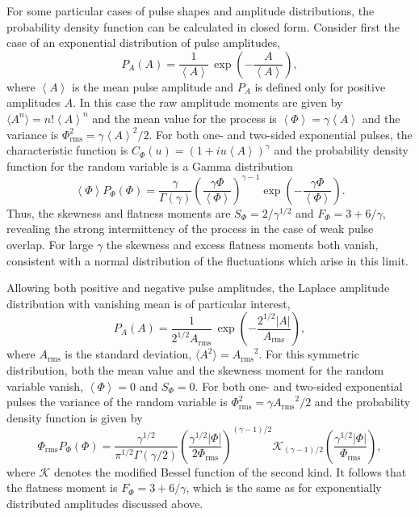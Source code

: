 \documentclass[aps,prb,12pt,a4paper,preprint,amsmath,amssymb,groupedaddress]{revtex4-1}
\newcommand{\ave}[1]{{\left<#1\right>}}
\newcommand{\abs}[1]{{\left|#1\right|}}\newcommand{\order}[1]{{\mathcal{O}\left(#1\right)}}
\newcommand{\Phiave}{\ensuremath{\ave{\Phi}}}
\newcommand{\Phirms}{\ensuremath{\Phi}_\text{rms}}
\newcommand{\Arms}{\ensuremath{A_\text{rms}}}
\newcommand{\Aave}{\ensuremath{\ave{A}}}
\begin{document}
For some particular cases of pulse shapes and amplitude distributions, the probability density function can be calculated in closed form. Consider first the case of an exponential distribution of pulse amplitudes,
\begin{equation}
P_A(A) = \frac{1}{\Aave}\,\exp\left( - \frac{A}{\Aave} \right) ,
\end{equation}
where $\Aave$ is the mean pulse amplitude and $P_A$ is defined only for positive amplitudes $A$. In this case the raw amplitude moments are given by $\langle{A^n}\rangle=n!\Aave^n$ and the mean value for the process is $\Phiave=\gamma\Aave$ and the variance is $\Phirms^2=\gamma\Aave^2/2$. For both one- and two-sided exponential pulses, the characteristic function is $C_\Phi(u)=(1+iu\Aave)^\gamma$ and the probability density function for the random variable is a Gamma distribution\cite{garcia-prl,garcia-php,theodorsen-php}
\begin{equation}
\Phiave P_\Phi(\Phi) = \frac{\gamma}{\Gamma(\gamma)}\left( \frac{\gamma\Phi}{\Phiave} \right)^{\gamma-1}\exp\left( - \frac{\gamma\Phi}{\Phiave} \right) .
\end{equation}
Thus, the skewness and flatness moments are $S_\Phi=2/\gamma^{1/2}$ and $F_\Phi=3+6/\gamma$, revealing the strong intermittency of the process in the case of weak pulse overlap. For large $\gamma$ the skewness and excess flatness moments both vanish, consistent with a normal distribution of the fluctuations which arise in this limit.\cite{garcia-prl,garcia-php}


Allowing both positive and negative pulse amplitudes, the Laplace amplitude distribution with vanishing mean is of particular interest,
\begin{equation}
P_A(A) = \frac{1}{2^{1/2}\Arms}\,\exp\left( - \frac{2^{1/2}\abs{A}}{\Arms} \right) ,
\end{equation}
where $\Arms$ is the standard deviation, $\langle{A^2}\rangle=\Arms^2$. 
For this symmetric distribution, both the mean value and the skewness moment for the random variable vanish, $\Phiave=0$ and $S_\Phi=0$. For both one- and two-sided exponential pulses the variance of the random variable is $\Phirms^2=\gamma\Arms^2/2$ and the probability density function is given by\cite{theodorsen-ppcf}
\begin{equation}
\Phirms P_\Phi(\Phi) = \frac{\gamma^{1/2}}{\pi^{1/2}\Gamma(\gamma/2)}\left( \frac{\gamma^{1/2}\abs{\Phi}}{2\Phirms} \right)^{(\gamma-1)/2}\mathcal{K}_{(\gamma-1)/2}\left( \frac{\gamma^{1/2}\abs{\Phi}}{\Phirms} \right) ,
\end{equation}
where $\mathcal{K}$ denotes the modified Bessel function of the second kind.
It follows that the flatness moment is $F_\Phi=3+6/\gamma$, which is the same as for exponentially distributed amplitudes discussed above. %
\end{document}

